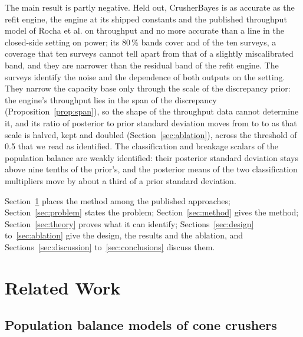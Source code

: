 \documentclass[journal]{IEEEtran}
\newcommand{\pct}{\,\%}
\begin{document}
The main result is partly negative. Held out, CrusherBayes is as accurate as the refit engine, the engine at its shipped
constants and the published throughput model of Rocha et al. on throughput and no more accurate than a line in the closed-side setting on power; its 80\pct{} bands cover \cbTphCovN{} and \cbKwCovN{} of the ten
surveys, a coverage that ten surveys cannot tell apart from that of a slightly miscalibrated band, and they are narrower
than the residual band of the refit engine. The surveys identify the noise and the dependence of both outputs on the
setting. They narrow the capacity base only through the scale of the discrepancy prior: the engine's throughput lies in the
span of the discrepancy (Proposition~\ref{prop:span}), so the shape of the throughput data cannot determine it, and its
ratio of posterior to prior standard deviation moves from \abTauHalfQRefContr{} to \abFullQRefContr{} to
\abTauDoubleQRefContr{} as that scale is halved, kept and doubled (Section~\ref{sec:ablation}), across the threshold of 0.5
that we read as identified. The classification and breakage scalars of the population balance are weakly identified: their
posterior standard deviation stays above nine tenths of the prior's, and the posterior means of the two classification
multipliers move by about a third of a prior standard deviation.

Section~\ref{sec:related} places the method among the published approaches; Section~\ref{sec:problem} states the
problem; Section~\ref{sec:method} gives the method; Section~\ref{sec:theory} proves what it can identify;
Sections~\ref{sec:design} to~\ref{sec:ablation} give the design, the results and the ablation, and
Sections~\ref{sec:discussion} to~\ref{sec:conclusions} discuss them.

\section{Related Work}\label{sec:related}

\subsection{Population balance models of cone crushers}
\end{document}
